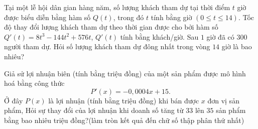 \begin{bt}%
	Tại một lễ hội dân gian hàng năm, số lượng khách tham dự tại thời điểm $t$ giờ được biểu diễn bằng hàm số $Q(t)$, trong đó $t$ tính bằng giờ $(0\leq t \leq 14)$. Tốc độ thay đổi lượng khách tham dự theo thời gian được cho bởi hàm số $Q'(t)=8t^3-144t^2+576t$, $Q'(t)$ tính bằng khách/giờ. Sau $1$ giờ đã có $300$ người tham dự. Hỏi số lượng khách tham dự đông nhất trong vòng $14$ giờ là bao nhiêu?
\end{bt}

\begin{bt}%
	Giả sử lợi nhuận biên (tính bằng triệu đồng) của một sản phẩm được mô hình hoá bằng công thức 
	$$P'(x)=-0,0004x+15.$$
	Ở đây $P(x)$ là lợi nhuận (tính bằng triệu đồng) khi bán được $x$ đơn vị sản phẩm, Hỏi sự thay đổi của lợi nhuận khi doanh số tăng từ $33$ lên $35$ sản phẩm bằng bao nhiêu triệu đồng?(làm tròn kết quả đến chữ số thập phân thứ nhất) \\ 
\end{bt}


